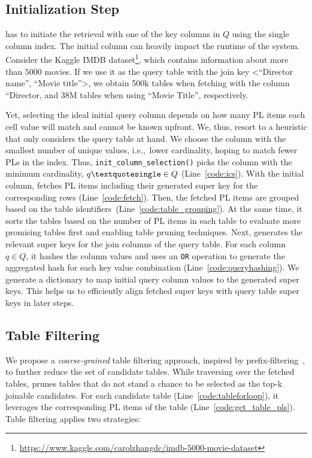 \subsection{Initialization Step}
\system has to initiate the retrieval with one of the key columns in $Q$ using the single column index.
The initial column can heavily impact the runtime of the system.
Consider the Kaggle IMDB dataset\footnote{\url{https://www.kaggle.com/carolzhangdc/imdb-5000-movie-dataset}}, which contains information about more than $5000$ movies. If we use it as the query table with the join key <``Director name'', ``Movie title''>, we obtain 500k tables when fetching with the column ``Director, and 38M tables when using ``Movie Title'', respectively.

Yet, selecting the ideal initial query column depends on how many PL items each cell value will match and cannot be known upfront.
We, thus, resort to a heuristic that only considers the query table at hand.
We choose the column with the smallest number of unique values, i.e.,~lower cardinality, hoping to match fewer PLs in the index.
Thus, \texttt{init\_column\_selection()} picks the column with the minimum cardinality, $q\textquotesingle \in Q$ (Line~\ref{code:ics}). 
With the initial column, \system fetches PL items including their generated super key for the corresponding rows (Line~\ref{code:fetch}).
Then, the fetched PL items are grouped based on the table identifiers~(Line~\ref{code:table_grouping}).
At the same time, it sorts the tables based on the number of PL items in each table to evaluate more promising tables first and enabling table pruning techniques.
Next, \system generates the relevant super keys for the join columns of the query table.
For each column $q \in Q$, it hashes the column values and uses an \texttt{OR} operation to generate the aggregated hash  for each key value combination (Line~\ref{code:queryhashing}).
We generate a dictionary to map initial query column values to the generated super keys.
This helps us to efficiently align fetched super keys with query table super keys in later steps.

\subsection{Table Filtering}
We propose a {\em coarse-grained} table filtering approach, inspired by prefix-filtering~\cite{chaudhuri2006primitive}, to further reduce the set of candidate tables.
While traversing over the fetched tables, \system prunes tables that do not stand a chance to be selected as the top-k joinable candidates.
For each candidate table (Line~\ref{code:tableforloop}), it leverages the corresponding PL items of the table (Line~\ref{code:get_table_pls}).
Table filtering applies two strategies:

